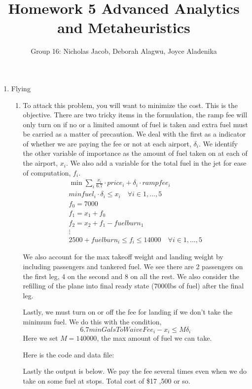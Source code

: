 \documentclass[11pt]{article}
\author{Group 16: Nicholas Jacob, Deborah Alagwu, Joyce Aladenika}
\title{Homework 5 Advanced Analytics and Metaheuristics}
\begin{document}
\maketitle

\begin{enumerate}
\item Flying
\begin{enumerate}
\item To attack this problem, you will want to minimize the cost.  This is the objective.  There are two tricky items in the formulation, the ramp fee will only turn on if no or a limited amount of fuel is taken and extra fuel must be carried as a matter of precaution.  We deal with the first as a indicator of whether we are paying the fee or not at each airport, $\delta_i$.  We identify the other variable of importance as the amount of fuel taken on at each of the airport, $x_i$.  We also add a variable for the total fuel in the jet for ease of computation, $f_i$.
\begin{eqnarray}
\min \sum_{i}\frac{x_i}{6.7}\cdot price_i + \delta_i\cdot rampfee_i\\
minfuel_i\cdot\delta_i\leq x_i\quad \forall i\in {1,\dots ,5}\\
f_0 = 7000\\
f_1 = x_1 + f_0\\
f_2 = x_2 + f_1 - fuelburn_1\\
\vdots\\
2500 + fuelburn_i \leq f_i \leq 14000\quad \forall i \in {1,\dots ,5}
\end{eqnarray}

We also account for the max takeoff weight and landing weight by including passengers and tankered fuel.  We see there are 2 passengers on the first leg, 4 on the second and 8 on all the rest.  We also consider the refilling of the plane into final ready state (7000lbs of fuel) after the final leg.

Lastly, we must turn on or off the fee for landing if we don't take the minimum fuel.  We do this with the condition,
\[
6.7minGalsToWaiveFee_i - x_i\leq M\delta_i
\]
Here we set $M = 140000$, the max amount of fuel we can take.

Here is the code and data file:


{\tiny {}}


{\tiny {}}

Lastly the output is below.  We pay the fee several times even when we do take on some fuel at stops.  Total cost of \$17 ,500 or so.


\end{enumerate}
\end{enumerate}
\end{document}
